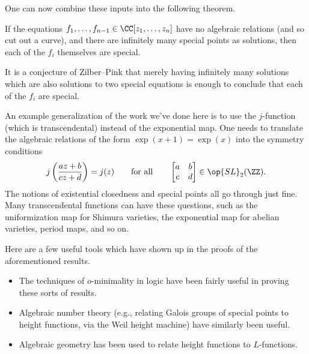 \documentclass{article}
\begin{document}
One can now combine these inputs into the following theorem.
\begin{theorem}
	If the equations $f_1,\ldots,f_{n-1}\in\CC[z_1,\ldots,z_n]$ have no algebraic relations (and so cut out a curve), and there are infinitely many special points as solutions, then each of the $f_i$ themselves are special.
\end{theorem}
\begin{remark}
	It is a conjecture of Zilber--Pink that merely having infinitely many solutions which are also solutions to two special equations is enough to conclude that each of the $f_i$ are special.
\end{remark}
\begin{remark}
	An example generalization of the work we've done here is to use the $j$-function (which is transcendental) instead of the exponential map. One needs to translate the algebraic relations of the form $\exp(x+1)=\exp(x)$ into the symmetry conditions
	\[j\left(\frac{az+b}{cz+d}\right)=j(z)\qquad\text{for all}\qquad\begin{bmatrix}
		a & b \\
		c & d
	\end{bmatrix}\in\op{SL}_2(\ZZ).\]
	The notions of existential closedness and special points all go through just fine. Many transcendental functions can have these questions, such as the uniformization map for Shimura varieties, the exponential map for abelian varieties, period maps, and so on.
\end{remark}
\begin{remark}
	Here are a few useful tools which have shown up in the proofs of the aforementioned results.
	\begin{itemize}
		\item The techniques of $o$-minimality in logic have been fairly useful in proving these sorts of results.
		\item Algebraic number theory (e.g., relating Galois groups of special points to height functions, via the Weil height machine) have similarly been useful.
		\item Algebraic geometry has been used to relate height functions to $L$-functions.
	\end{itemize}
\end{remark}
\end{document}
